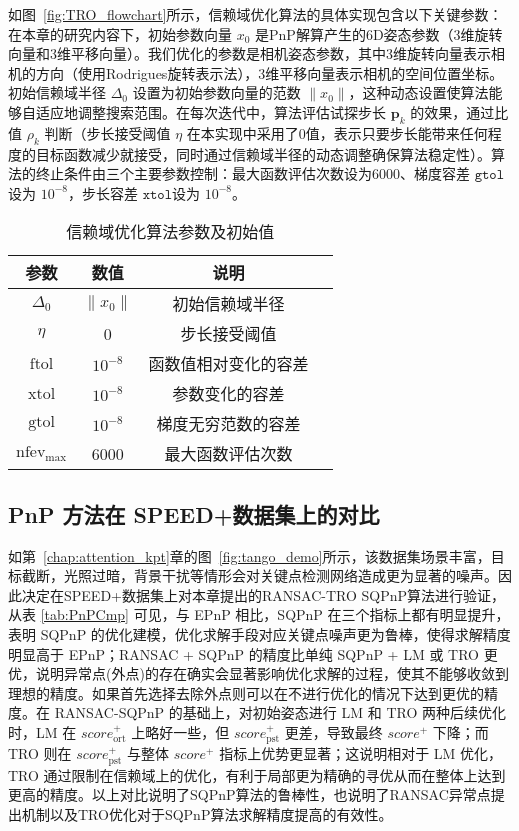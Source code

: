 如图~\ref{fig:TRO_flowchart}所示，信赖域优化算法的具体实现包含以下关键参数：在本章的研究内容下，初始参数向量 $x_0$ 是PnP解算产生的6D姿态参数（3维旋转向量和3维平移向量）。我们优化的参数是相机姿态参数，其中3维旋转向量表示相机的方向（使用Rodrigues旋转表示法），3维平移向量表示相机的空间位置坐标。初始信赖域半径 $\Delta_0$ 设置为初始参数向量的范数 $\|x_0\|$，这种动态设置使算法能够自适应地调整搜索范围。在每次迭代中，算法评估试探步长 $\mathbf{p}_k$ 的效果，通过比值 $\rho_k$ 判断（步长接受阈值 $\eta$ 在本实现中采用了0值，表示只要步长能带来任何程度的目标函数减少就接受，同时通过信赖域半径的动态调整确保算法稳定性）。算法的终止条件由三个主要参数控制：最大函数评估次数设为6000、梯度容差 $\texttt{gtol}$设为 $10^{-8}$，步长容差 $\texttt{xtol}$设为 $10^{-8}$。
\begin{table}[htbp]
	\centering
	\caption{信赖域优化算法参数及初始值}
	\label{tab:tr_parameters}
	\begin{tabular}{cccp{8cm}}
		\hline
		参数 & 数值 & 说明 \\
		\hline
		$\Delta_0$ & $\|x_0\|$ & 初始信赖域半径\\
		$\eta$ & 0 & 步长接受阈值 \\
		$\text{ftol}$ & $10^{-8}$ & 函数值相对变化的容差 \\
		$\text{xtol}$ & $10^{-8}$ & 参数变化的容差 \\
		$\text{gtol}$ & $10^{-8}$ & 梯度无穷范数的容差 \\
		$\text{nfev}_\text{max}$ & 6000 & 最大函数评估次数 \\
		\hline
	\end{tabular}
\end{table}


\subsection{PnP 方法在 SPEED+数据集上的对比}
如第~\ref{chap:attention_kpt}章的图~\ref{fig:tango_demo}所示，该数据集场景丰富，目标截断，光照过暗，背景干扰等情形会对关键点检测网络造成更为显著的噪声。因此决定在SPEED+数据集上对本章提出的RANSAC-TRO SQPnP算法进行验证，
从表 \ref{tab:PnPCmp} 可见，与 EPnP 相比，SQPnP 在三个指标上都有明显提升，表明 SQPnP 的优化建模，优化求解手段对应关键点噪声更为鲁棒，使得求解精度明显高于 EPnP；RANSAC + SQPnP 的精度比单纯 SQPnP + LM 或 TRO 更优，说明异常点(外点)的存在确实会显著影响优化求解的过程，使其不能够收敛到理想的精度。如果首先选择去除外点则可以在不进行优化的情况下达到更优的精度。在 RANSAC-SQPnP 的基础上，对初始姿态进行 LM 和 TRO 两种后续优化时，LM 在 $score_{\text{ort}}^+$ 上略好一些，但 $score_{\text{pst}}^+$ 更差，导致最终 $score^+$ 下降；而 TRO 则在 $score_{\text{pst}}^+$ 与整体 $score^+$ 指标上优势更显著；这说明相对于 LM 优化，TRO 通过限制在信赖域上的优化，有利于局部更为精确的寻优从而在整体上达到更高的精度。以上对比说明了SQPnP算法的鲁棒性，也说明了RANSAC异常点提出机制以及TRO优化对于SQPnP算法求解精度提高的有效性。

